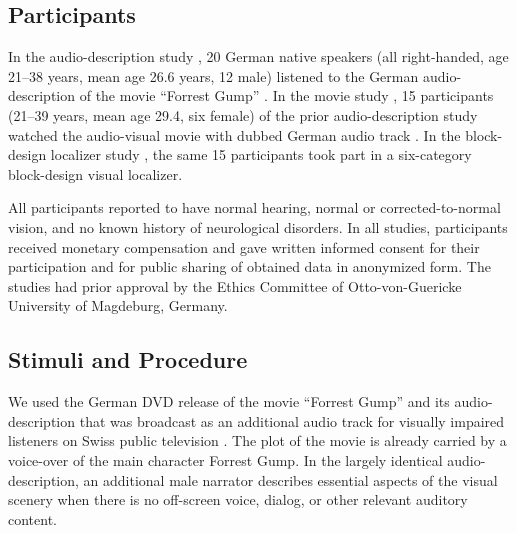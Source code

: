 \documentclass[english]{article}
\begin{document}
\subsection{Participants}
In the audio-description study \citep{hanke2014audiomovie}, 20 German native speakers (all
right-handed, age 21–38 years, mean age 26.6 years, 12 male) listened to the
German audio-description \citep{ForrestGumpGermanAD} of the movie ``Forrest
Gump'' \citep{ForrestGumpMovie}.
In the movie study \citep{hanke2016simultaneous}, 15 participants (21–39 years,
mean age 29.4, six female) of the prior audio-description study watched the audio-visual movie
with dubbed German audio track \citep{ForrestGumpDVD}.
In the block-design localizer study \citep{sengupta2016extension}, the same 15 participants took
part in a six-category block-design visual localizer.

All participants reported to have normal hearing, normal or corrected-to-normal
vision, and no known history of neurological disorders.
In all studies, participants received monetary compensation and gave written
informed consent for their participation and for public sharing of obtained data
in anonymized form. The studies had prior approval by the Ethics Committee of
Otto-von-Guericke University of Magdeburg, Germany.


\subsection{Stimuli and Procedure}

We used the German DVD release \citep{ForrestGumpDVD} of the movie ``Forrest
Gump'' \citep{ForrestGumpMovie} and its audio-description that was broadcast as
an additional audio track for visually impaired listeners on Swiss public
television \citep{ForrestGumpGermanAD}.
The plot of the movie is already carried by a voice-over of the main character
Forrest Gump.
In the largely identical audio-description, an additional male narrator
describes essential aspects of the visual scenery when there is no off-screen
voice, dialog, or other relevant auditory content.
\end{document}
